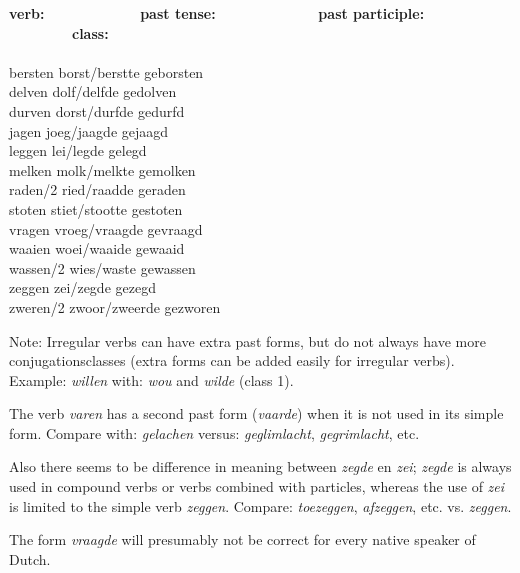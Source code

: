 \begin{itemize}
\begin{tabbing}
{\bf verb:}   \ \ \ \ \ \ \ \ \ \ \ \ \      \=   
{\bf past tense:}  \ \ \ \ \ \ \ \ \ \ \ \ \ \    \=    
{\bf past participle:}  \ \ \ \ \ \ \ \ \  \=
{\bf class:} \\
           \>               \>                   \>                   \\
bersten    \> borst/berstte \> geborsten  \> [7, 16] \\
delven     \> dolf/delfde   \> gedolven   \> [7, 15] \\
durven     \> dorst/durfde  \> gedurfd    \> [13, 3] \\
jagen      \> joeg/jaagde   \> gejaagd    \> [13, 3] \\
leggen     \> lei/legde     \> gelegd     \> [13, 3] \\
melken     \> molk/melkte   \> gemolken   \> [7, 15] \\ 
raden/2    \> ried/raadde   \> geraden    \> [5, 15] \\
stoten     \> stiet/stootte \> gestoten   \> [5, 15] \\
vragen     \> vroeg/vraagde \> gevraagd   \> [13, 3] \\
waaien     \> woei/waaide   \> gewaaid    \> [13, 3] \\
wassen/2   \> wies/waste    \> gewassen   \> [5, 15] \\
zeggen     \> zei/zegde     \> gezegd     \> [1, 3]  \\
zweren/2   \> zwoor/zweerde \> gezworen   \> [7, 15] \\
\end{tabbing}

Note:
Irregular verbs can have extra past forms, but do not always have
more conjugationsclasses (extra forms can be added easily for irregular
verbs). Example: {\em willen} with: {\em wou} and {\em wilde} (class 1).

The verb {\em varen} has a second past form ({\em vaarde}) when it is not used 
in its simple form. Compare with: {\em gelachen} versus: {\em geglimlacht}, 
{\em gegrimlacht}, etc.

Also there seems to be difference in meaning between {\em zegde} en {\em zei};
{\em zegde} is always used in compound verbs or verbs combined with particles,
whereas the use of {\em zei} is limited to the simple verb {\em zeggen}. 
Compare:
{\em toezeggen}, {\em afzeggen}, etc. vs. {\em zeggen}.

The form {\em vraagde} will presumably not be correct for every native 
speaker of Dutch.


\end{itemize}
